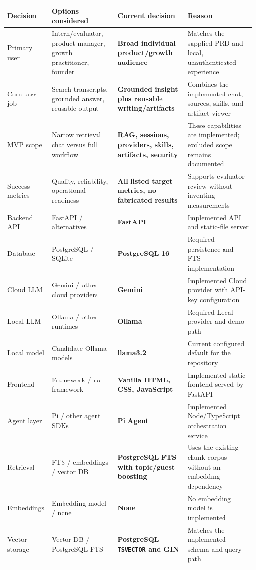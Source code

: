 \documentclass[11pt]{article}
\begin{document}
\footnotesize
\begin{longtable}{@{}L{1.18in}L{1.72in}L{1.20in}L{2.18in}@{}}
\toprule
\textbf{Decision} & \textbf{Options considered} & \textbf{Current decision} & \textbf{Reason} \\
\midrule
Primary user & Intern/evaluator, product manager, growth practitioner, founder & \textbf{Broad individual product/growth audience} & Matches the supplied PRD and local, unauthenticated experience \\
Core user job & Search transcripts, grounded answer, reusable output & \textbf{Grounded insight plus reusable writing/artifacts} & Combines the implemented chat, sources, skills, and artifact viewer \\
MVP scope & Narrow retrieval chat versus full workflow & \textbf{RAG, sessions, providers, skills, artifacts, security} & These capabilities are implemented; excluded scope remains documented \\
Success metrics & Quality, reliability, operational readiness & \textbf{All listed target metrics; no fabricated results} & Supports evaluator review without inventing measurements \\
Backend API & FastAPI / alternatives & \textbf{FastAPI} & Implemented API and static-file server \\
Database & PostgreSQL / SQLite & \textbf{PostgreSQL 16} & Required persistence and FTS implementation \\
Cloud LLM & Gemini / other cloud providers & \textbf{Gemini} & Implemented Cloud provider with API-key configuration \\
Local LLM & Ollama / other runtimes & \textbf{Ollama} & Required Local provider and demo path \\
Local model & Candidate Ollama models & \textbf{llama3.2} & Current configured default for the repository \\
Frontend & Framework / no framework & \textbf{Vanilla HTML, CSS, JavaScript} & Implemented static frontend served by FastAPI \\
Agent layer & Pi / other agent SDKs & \textbf{Pi Agent} & Implemented Node/TypeScript orchestration service \\
Retrieval & FTS / embeddings / vector DB & \textbf{PostgreSQL FTS with topic/guest boosting} & Uses the existing chunk corpus without an embedding dependency \\
Embeddings & Embedding model / none & \textbf{None} & No embedding model is implemented \\
Vector storage & Vector DB / PostgreSQL FTS & \textbf{PostgreSQL \texttt{TSVECTOR} and GIN} & Matches the implemented schema and query path \\

\end{longtable}
\end{document}
